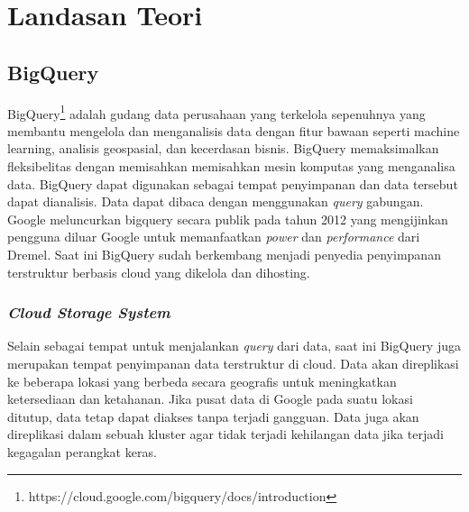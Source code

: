 \chapter{Landasan Teori}
\label{chap:teori}

\section{BigQuery\cite{bqa}}
BigQuery\footnote{https://cloud.google.com/bigquery/docs/introduction} adalah gudang data perusahaan yang terkelola sepenuhnya yang membantu mengelola dan menganalisis data dengan fitur bawaan seperti machine learning, analisis geospasial, dan kecerdasan bisnis. BigQuery memaksimalkan fleksibelitas dengan memisahkan memisahkan mesin komputas yang menganalisa data. BigQuery dapat digunakan sebagai tempat penyimpanan dan data tersebut dapat dianalisis. Data dapat dibaca dengan menggunakan \textit{query} gabungan. Google meluncurkan bigquery secara publik pada tahun 2012 yang mengijinkan pengguna diluar Google untuk memanfaatkan \textit{power} dan \textit{performance} dari Dremel. Saat ini BigQuery sudah berkembang menjadi penyedia penyimpanan terstruktur berbasis cloud yang dikelola dan dihosting. 
\subsection{\textit{Cloud Storage System}}
Selain sebagai tempat untuk menjalankan \textit{query} dari data, saat ini BigQuery juga merupakan tempat penyimpanan data terstruktur di cloud. Data akan direplikasi ke beberapa lokasi yang berbeda secara geografis untuk meningkatkan ketersediaan dan ketahanan. Jika pusat data di Google pada suatu lokasi ditutup, data tetap dapat diakses tanpa terjadi gangguan. Data juga akan direplikasi dalam sebuah kluster agar tidak terjadi kehilangan data jika terjadi kegagalan perangkat keras. 



